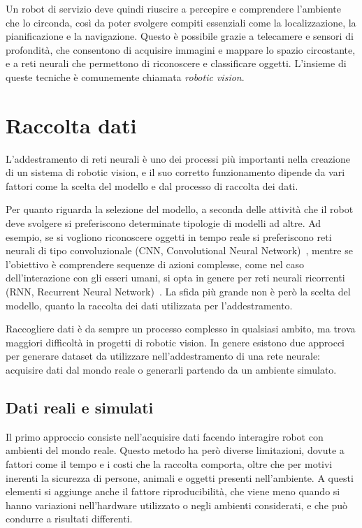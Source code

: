 \documentclass[12pt]{report}
\begin{document}
Un robot di servizio deve quindi riuscire a percepire e comprendere l'ambiente che lo circonda, così da poter svolgere compiti essenziali come la localizzazione, la pianificazione e la navigazione. Questo è possibile grazie a telecamere e sensori di profondità, che consentono di acquisire immagini e mappare lo spazio circostante, e a reti neurali che permettono di riconoscere e classificare oggetti. L'insieme di queste tecniche è comunemente chiamata \textit{robotic vision}.

\section{Raccolta dati}
\label{sec:raccolta_dati}

L'addestramento di reti neurali è uno dei processi più importanti nella creazione di un sistema di robotic vision, e il suo corretto funzionamento dipende da vari fattori come la scelta del modello e dal processo di raccolta dei dati.

Per quanto riguarda la selezione del modello, a seconda delle attività che il robot deve svolgere si preferiscono determinate tipologie di modelli ad altre. Ad esempio, se si vogliono riconoscere oggetti in tempo reale si preferiscono reti neurali di tipo convoluzionale (CNN, Convolutional Neural Network)~\cite{oshea2015introductionconvolutionalneuralnetworks}, mentre se l'obiettivo è comprendere sequenze di azioni complesse, come nel caso dell'interazione con gli esseri umani, si opta in genere per reti neurali ricorrenti (RNN, Recurrent Neural Network)~\cite{ZHANG20209}. La sfida più grande non è però la scelta del modello, quanto la raccolta dei dati utilizzata per l'addestramento.

Raccogliere dati è da sempre un processo complesso in qualsiasi ambito, ma trova maggiori difficoltà in progetti di robotic vision. In genere esistono due approcci per generare dataset da utilizzare nell'addestramento di una rete neurale: acquisire dati dal mondo reale o generarli partendo da un ambiente simulato.

\subsection{Dati reali e simulati}
\label{sec:dati_reali}

Il primo approccio consiste nell'acquisire dati facendo interagire robot con ambienti del mondo reale. Questo metodo ha però diverse limitazioni, dovute a fattori come il tempo e i costi che la raccolta comporta, oltre che per motivi inerenti la sicurezza di persone, animali e oggetti presenti nell'ambiente. A questi elementi si aggiunge anche il fattore riproducibilità, che viene meno quando si hanno variazioni nell'hardware utilizzato o negli ambienti considerati, e che può condurre a risultati differenti.
\end{document}
